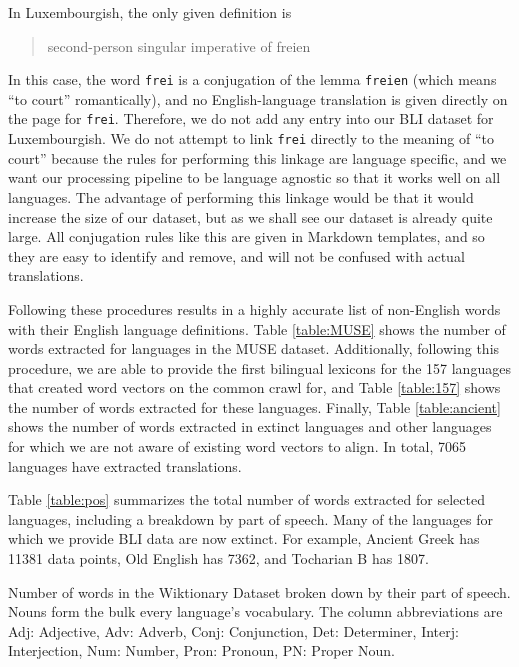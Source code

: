 \documentclass[11pt]{article}
\begin{document}
{In Luxembourgish, the only given definition is
\begin{quote}
second-person singular imperative of freien
\end{quote}
In this case, the word \texttt{frei} is a conjugation of the lemma \texttt{freien} (which means ``to court'' romantically), and no English-language translation is given directly on the page for \texttt{frei}.
Therefore, we do not add any entry into our BLI dataset for Luxembourgish.
We do not attempt to link \texttt{frei} directly to the meaning of ``to court'' because the rules for performing this linkage are language specific,
and we want our processing pipeline to be language agnostic so that it works well on all languages.
The advantage of performing this linkage would be that it would increase the size of our dataset,
but as we shall see our dataset is already quite large.
All conjugation rules like this are given in Markdown templates,
and so they are easy to identify and remove,
and will not be confused with actual translations.

Following these procedures results in a highly accurate list of non-English words with their English language definitions.
Table \ref{table:MUSE} shows the number of words extracted for languages in the MUSE dataset.
Additionally, following this procedure, we are able to provide the first bilingual lexicons for the 157 languages that \citet{} created word vectors on the common crawl for, and Table \ref{table:157} shows the number of words extracted for these languages.
Finally, Table \ref{table:ancient} shows the number of words extracted in extinct languages and other languages for which we are not aware of existing word vectors to align.
In total, 7065 languages have extracted translations.
}
Table \ref{table:pos} summarizes the total number of words extracted for selected languages,
including a breakdown by part of speech.
Many of the languages for which we provide BLI data are now extinct.
For example, Ancient Greek has 11381 data points, Old English has 7362, and Tocharian B has 1807.

\begin{table}
    \centering
    \small
    \resizebox{\textwidth}{!}{}
    \caption{
        Number of words in the Wiktionary Dataset broken down by their part of speech.
        Nouns form the bulk every language's vocabulary.
    The column abbreviations are Adj: Adjective, Adv: Adverb, Conj: Conjunction, Det: Determiner, Interj: Interjection, Num: Number, Pron: Pronoun, PN: Proper Noun.
}
    \label{table:pos}
\end{table}
\end{document}
